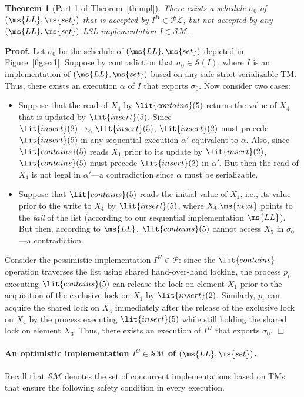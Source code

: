 \documentclass[11pt,pdftex,letterpaper]{article}
\newtheorem{theorem}{Theorem}
\newenvironment{proof}[1][Proof]{\noindent\textbf{#1.} }{\hfill $\Box$\\[2mm]}
\def\S{\ensuremath{\mathcal{S}}}
\newcommand{\LL}{\ms{LL}}
\begin{document}
\begin{theorem}[Part 1 of  Theorem~\ref{th:mpl}]
There exists a schedule $\sigma_0$ of $(\LL,\ms{set})$ that is
accepted by $I^H\in \mathcal{PL}$, but not accepted by \emph{any}
$(\LL ,\ms{set})$-LSL implementation $I\in \mathcal{SM}$.
\end{theorem}
\begin{proof}
Let $\sigma_0$ be the schedule of $(\LL ,\ms{set})$ depicted in Figure~\ref{fig:ex1}.
Suppose by contradiction that $\sigma_0 \in\S(I)$, where $I$ is an implementation of $(\LL, \ms{set})$ based on any safe-strict serializable TM.
Thus, there exists an execution $\alpha$ of $I$ that exports $\sigma_0$.
Now consider two cases:
\begin{itemize}
\item
Suppose that the read of $X_4$ by $\lit{contains}(5)$ 
returns the value of $X_4$ that is updated by $\lit{insert}(5)$.
Since $\lit{insert}(2) \rightarrow_{\alpha} \lit{insert}(5)$, 
$\lit{insert}(2)$ must precede $\lit{insert}(5)$ in any sequential execution $\alpha'$ equivalent to $\alpha$. 
Also, since $\lit{contains}(5)$ reads $X_1$ prior to its update by $\lit{insert}(2)$, 
$\lit{contains}(5)$ must precede $\lit{insert}(2)$ in $\alpha'$. 
But then the read of $X_4$ is not legal in $\alpha'$---a contradiction since $\alpha$ must be serializable.
\item
Suppose that $\lit{contains}(5)$
reads the initial value of $X_4$, i.e., its value prior to the write to $X_4$ by $\lit{insert}(5)$, 
where $X_4.\ms{next}$ points to the
\emph{tail} of the list (according to our sequential implementation $\LL$).
But then, according to $\LL$, $\lit{contains}(5)$ cannot access
$X_5$ in $\sigma_0$---a contradiction.  
\end{itemize}
Consider the pessimistic implementation $I^H \in \mathcal{P}$:
since the $\lit{contains}$ operation traverses the list using shared hand-over-hand locking, 
the process $p_i$ executing $\lit{contains}(5)$
can release the lock on element $X_1$ prior to the acquisition of the exclusive lock on $X_1$ by $\lit{insert}(2)$.
Similarly, $p_i$ can acquire the shared lock on $X_4$ immediately after the release of the 
exclusive lock on $X_4$ by the process executing $\lit{insert}(5)$ while still holding 
the shared lock on element $X_3$. Thus, there exists an execution of $I^H$ that exports $\sigma_0$.
\end{proof}\paragraph{An optimistic implementation $I^C\in \mathcal{SM}$ of $(\LL,\ms{set})$.}
Recall that $\mathcal{SM}$ denotes the set of concurrent implementations based on TMs
that ensure the following safety condition in every execution.
\end{document}
